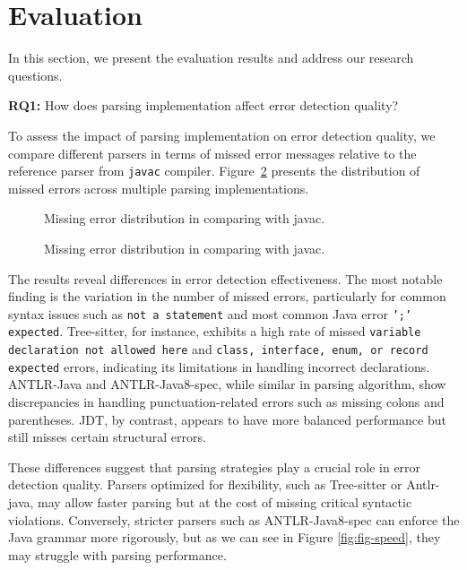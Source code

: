 \documentclass[conference]{IEEEtran}
\begin{document}
\section{Evaluation}
In this section, we present the evaluation results and address our research questions.


\textbf{RQ1:} How does parsing implementation affect error detection quality?

To assess the impact of parsing implementation on error detection quality, we compare different parsers in terms of missed error messages relative to the reference parser from \texttt{javac} compiler. Figure~\ref{fig:error_distribution} presents the distribution of missed errors across multiple parsing implementations. 

\begin{figure}[htbp]

\caption{Missing error distribution in comparing with javac.}
\label{fig:error_distribution}
\end{figure}

\begin{figure}[htbp]

\caption{Missing error distribution in comparing with javac.}
\label{fig:error_distribution}
\end{figure}

The results reveal differences in error detection effectiveness. The most notable finding is the variation in the number of missed errors, particularly for common syntax issues such as \texttt{not a statement} and most common Java error\cite{error-frequence} \texttt{';' expected}. Tree-sitter, for instance, exhibits a high rate of missed \texttt{variable declaration not allowed here} and \texttt{class, interface, enum, or record expected}  errors, indicating its limitations in handling incorrect declarations. ANTLR-Java and ANTLR-Java8-spec, while similar in parsing algorithm, show discrepancies in handling punctuation-related errors such as missing colons and parentheses. JDT, by contrast, appears to have more balanced performance but still misses certain structural errors.

These differences suggest that parsing strategies play a crucial role in error detection quality. Parsers optimized for flexibility, such as Tree-sitter or Antlr-java, may allow faster parsing but at the cost of missing critical syntactic violations. Conversely, stricter parsers such as ANTLR-Java8-spec can enforce the Java grammar more rigorously, but as we can see in Figure \ref{fig:fig-speed}, they may struggle with parsing performance.
\end{document}
